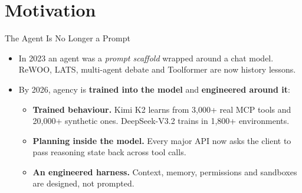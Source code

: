 \section{Motivation}

\begin{frame}{The Agent Is No Longer a Prompt}
    \begin{itemize}\itemsep0.45em
        \item In 2023 an agent was a \emph{prompt scaffold} wrapped around a chat model. ReWOO, LATS, multi-agent debate and Toolformer are now history lessons.
        \item By 2026, agency is \textbf{trained into the model} and \textbf{engineered around it}:
        \begin{itemize}\itemsep0.3em
            \item \textbf{Trained behaviour.} Kimi K2 learns from 3,000+ real MCP tools and 20,000+ synthetic ones. DeepSeek-V3.2 trains in 1,800+ environments.
            \item \textbf{Planning inside the model.} Every major API now asks the client to pass reasoning state back across tool calls.
            \item \textbf{An engineered harness.} Context, memory, permissions and sandboxes are designed, not prompted.
        \end{itemize}
    \end{itemize}
    \vspace{0.3em}
\end{frame}

